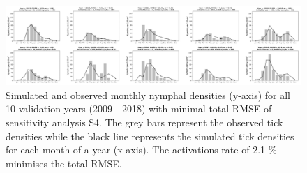 \documentclass[a4paper, 11pt]{scrartcl}
\begin{document}
\begin{figure}
\centering
\includegraphics[width=1.0\textwidth]{figures/independent_initial_ticks_without_beech}
\caption{Simulated and observed monthly nymphal densities (y-axis) for all 10 validation years (2009 - 2018) with minimal total RMSE of sensitivity analysis S4. The grey bars
represent the observed tick densities while the black line represents the simulated tick densities for each month of a year (x-axis). The activations rate of 2.1 \% minimises
the total RMSE.}
\label{fig:independent_initial_ticks_without_beech_rotated}
\end{figure}
\end{document}

